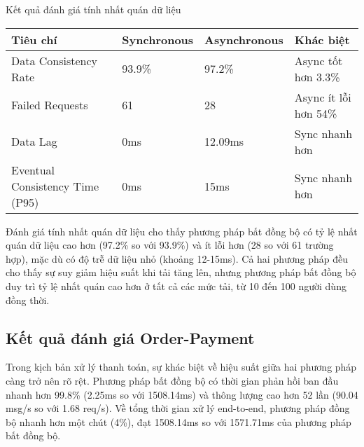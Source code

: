 \begin{table}[h]{Kết quả đánh giá tính nhất quán dữ liệu}
    \centering
    {\setlength{\arrayrulewidth}{1pt}
        \renewcommand{\arraystretch}{1.5}
        \setlength{\tabcolsep}{6pt}
        \begin{tabular}{|p{3.2cm}|p{3.2cm}|p{3.2cm}|p{3.2cm}|}
            \hline
            \textbf{Tiêu chí}               & \textbf{Synchronous} & \textbf{Asynchronous} & \textbf{Khác biệt}    \\
            \hline
            Data Consistency Rate           & 93.9\%               & 97.2\%                & Async tốt hơn 3.3\%   \\
            \hline
            Failed Requests                 & 61                   & 28                    & Async ít lỗi hơn 54\% \\
            \hline
            Data Lag                        & 0ms                  & 12.09ms               & Sync nhanh hơn        \\
            \hline
            Eventual Consistency Time (P95) & 0ms                  & 15ms                  & Sync nhanh hơn        \\
            \hline
        \end{tabular}}
\end{table}

Đánh giá tính nhất quán dữ liệu cho thấy phương pháp bất đồng bộ có tỷ lệ nhất quán dữ liệu cao hơn (97.2\% so với 93.9\%) và ít lỗi hơn (28 so với 61 trường hợp), mặc dù có độ trễ dữ liệu nhỏ (khoảng 12-15ms). Cả hai phương pháp đều cho thấy sự suy giảm hiệu suất khi tải tăng lên, nhưng phương pháp bất đồng bộ duy trì tỷ lệ nhất quán cao hơn ở tất cả các mức tải, từ 10 đến 100 người dùng đồng thời.

\subsection{Kết quả đánh giá Order-Payment}
Trong kịch bản xử lý thanh toán, sự khác biệt về hiệu suất giữa hai phương pháp càng trở nên rõ rệt. Phương pháp bất đồng bộ có thời gian phản hồi ban đầu nhanh hơn 99.8\% (2.25ms so với 1508.14ms) và thông lượng cao hơn 52 lần (90.04 msg/s so với 1.68 req/s). Về tổng thời gian xử lý end-to-end, phương pháp đồng bộ nhanh hơn một chút (4\%), đạt 1508.14ms so với 1571.71ms của phương pháp bất đồng bộ.

